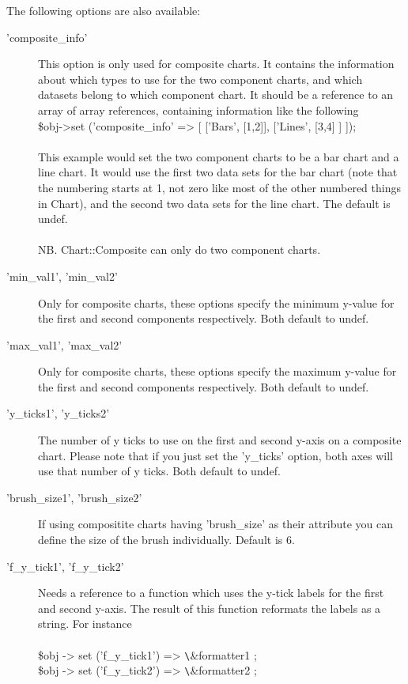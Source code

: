 The following options are also available:
\begin{description}
\item['composite\_info'] This option is only used for composite charts.  
      It contains the information about which types to use for the two component charts, 
      and which datasets belong to which component chart. 
      It should be a reference to an array of array references, 
      containing information like the following\\
      \$obj->set ('composite\_info' => [ ['Bars', [1,2]],  ['Lines', [3,4] ] ]);\\
\\
      This example would set the two component charts to be a bar chart and a line chart. 
      It would use the first two data sets for the bar chart
      (note that the numbering starts at 1, 
      not zero like most of the other numbered things in Chart), 
      and the second two data sets for the line chart. The default is undef.\\
      \\
      NB. Chart::Composite can only do two component charts.
      
\item['min\_val1', 'min\_val2'] Only for composite charts, 
     these options specify the minimum y-value for the first and second components
     respectively. Both default to undef.

\item['max\_val1', 'max\_val2'] Only for composite charts, 
     these options specify the maximum y-value for the first and second components
     respectively. Both default to undef.

\item['y\_ticks1', 'y\_ticks2'] The number of y ticks to use on the first 
     and second y-axis on a composite chart.  
     Please note that if you just set the 'y\_ticks' option, 
     both axes will use that number of y ticks. Both default to undef.

\item['brush\_size1', 'brush\_size2'] If using compositite charts having
     'brush\_size' as their attribute you can define the size of the brush
     individually. Default is 6.
     
\item['f\_y\_tick1', 'f\_y\_tick2'] Needs a reference to a function which uses the y-tick
     labels for the first and second y-axis. 
     The result of this function reformats the labels as a string. For instance\\
     \\
     \$obj -> set ('f\_y\_tick1') => \verb|\|\&formatter1 ;\\
     \$obj -> set ('f\_y\_tick2') => \verb|\|\&formatter2 ;\\


\end{description}
